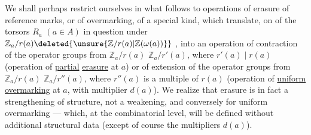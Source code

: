 We shall perhaps restrict ourselves in what follows to operations of erasure of reference marks, or of overmarking, of a special kind, which translate, on  of the torsors $R_a$ $(a\in A)$ in question under
$\mathbb Z_a/r(a)\deleted{\unsure{\mathbb Z/r(a)|\mathbb Z(\omega(a))}}$
,
into an operation of contraction of the operator groups from $\mathbb Z_a/r(a)$  $\mathbb Z_a/r'(a)$, where $r'(a)\mid r(a)$
(operation of  \uline{partial} \uline{erasure} at $a$)
or of extension of the operator groups from $\mathbb Z_a/r(a)$  $\mathbb Z_a/r''(a)$, where $r''(a)$  is a multiple of $r(a)$
(operation of \uline{uniform overmarking} at $a$, \deleted{)} with multiplier $d(a)$).
We realize  that  erasure is in fact a strengthening of structure, not a weakening, and conversely for uniform overmarking --- which, at the combinatorial level, will be defined without additional structural data (except of course the multipliers $d(a)$).
